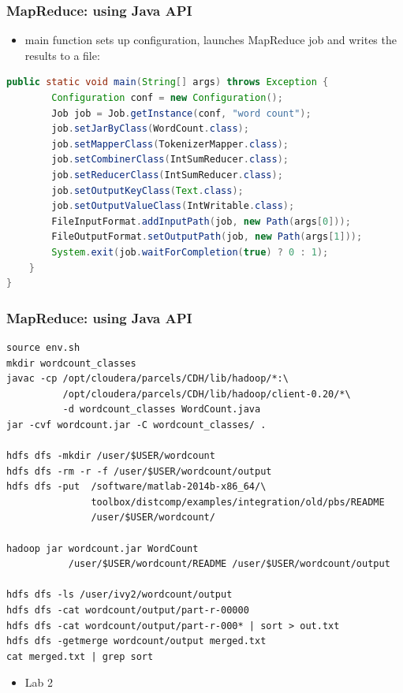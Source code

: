 \documentclass{beamer}
\begin{document}
\begin{frame}[fragile]
 \frametitle{MapReduce: using Java API}

\begin{itemize}
  \item {\color{blue}main} function sets up configuration, launches MapReduce job and writes the results to a file:
\end{itemize}
{\color{mycolorcode}
  \begin{lstlisting}[frame=single, basicstyle=\tiny,language=java]
    public static void main(String[] args) throws Exception {
        Configuration conf = new Configuration();
        Job job = Job.getInstance(conf, "word count");
        job.setJarByClass(WordCount.class);
        job.setMapperClass(TokenizerMapper.class);
        job.setCombinerClass(IntSumReducer.class);
        job.setReducerClass(IntSumReducer.class);
        job.setOutputKeyClass(Text.class);
        job.setOutputValueClass(IntWritable.class);
        FileInputFormat.addInputPath(job, new Path(args[0]));
        FileOutputFormat.setOutputPath(job, new Path(args[1]));
        System.exit(job.waitForCompletion(true) ? 0 : 1);
    }
}
  \end{lstlisting}
}
\end{frame}

\begin{frame}[fragile]
 \frametitle{MapReduce: using Java API}
{\color{mycolorcli}
  \begin{lstlisting}[frame=single, basicstyle=\tiny]
source env.sh
mkdir wordcount_classes
javac -cp /opt/cloudera/parcels/CDH/lib/hadoop/*:\
          /opt/cloudera/parcels/CDH/lib/hadoop/client-0.20/*\ 
          -d wordcount_classes WordCount.java
jar -cvf wordcount.jar -C wordcount_classes/ .

hdfs dfs -mkdir /user/$USER/wordcount
hdfs dfs -rm -r -f /user/$USER/wordcount/output
hdfs dfs -put  /software/matlab-2014b-x86_64/\
               toolbox/distcomp/examples/integration/old/pbs/README 
               /user/$USER/wordcount/

hadoop jar wordcount.jar WordCount 
           /user/$USER/wordcount/README /user/$USER/wordcount/output

hdfs dfs -ls /user/ivy2/wordcount/output
hdfs dfs -cat wordcount/output/part-r-00000
hdfs dfs -cat wordcount/output/part-r-000* | sort > out.txt
hdfs dfs -getmerge wordcount/output merged.txt
cat merged.txt | grep sort
\end{lstlisting}
}

\begin{itemize}
\item Lab 2
\end{itemize}

\end{frame}
\end{document}
